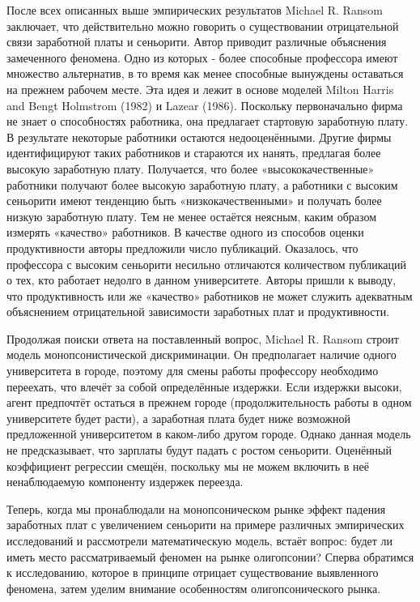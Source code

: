 \documentclass[a4paper, 12pt]{article}
\theoremstyle{definition}
\theoremstyle{plain}
\begin{document}
	После всех описанных выше эмпирических результатов Michael R. Ransom заключает, что действительно можно говорить о существовании отрицательной связи заработной платы и сеньорити. Автор приводит различные объяснения замеченного феномена. Одно из которых - более способные профессора имеют множество альтернатив, в то время как менее способные вынуждены оставаться на прежнем рабочем месте. Эта идея и лежит в основе моделей Milton Harris and Bengt Holmstrom (1982) и Lazear (1986). Поскольку первоначально фирма не знает о способностях работника, она предлагает стартовую заработную плату. В результате некоторые работники остаются недооценёнными. Другие фирмы идентифицируют таких работников и стараются их нанять, предлагая более высокую заработную плату. Получается, что более «высококачественные» работники получают более высокую заработную плату, а работники с высоким сеньорити имеют тенденцию быть «низкокачественными» и получать более низкую заработную плату. Тем не менее остаётся неясным, каким образом измерять «качество» работников. В качестве одного из способов оценки продуктивности авторы предложили число публикаций. Оказалось, что профессора с высоким сеньорити несильно отличаются количеством публикаций о тех, кто работает недолго в данном университете. Авторы пришли к выводу, что продуктивность или же «качество» работников не может служить адекватным объяснением отрицательной зависимости заработных плат и продуктивности.
	
	Продолжая поиски ответа на поставленный вопрос, Michael R. Ransom строит модель монопсонистической дискриминации. Он предполагает наличие одного университета в городе, поэтому для смены работы профессору необходимо переехать, что влечёт за собой определённые издержки. Если издержки высоки, агент предпочтёт остаться в прежнем городе (продолжительность работы в одном университете будет расти), а заработная плата будет ниже возможной предложенной университетом в каком-либо другом городе. Однако данная модель не предсказывает, что зарплаты будут падать с ростом сеньорити. Оценённый коэффициент регрессии смещён, поскольку мы не можем включить в неё ненаблюдаемую компоненту издержек переезда. 
	
	Теперь, когда мы пронаблюдали на монопсоническом рынке эффект падения заработных плат с увеличением сеньорити на примере различных эмпирических исследований и рассмотрели математическую модель, встаёт вопрос: будет ли иметь место рассматриваемый феномен на рынке олигопсонии? Сперва обратимся к исследованию, которое в принципе отрицает существование выявленного феномена, затем уделим внимание особенностям олигопсонического рынка.
	
\end{document}
